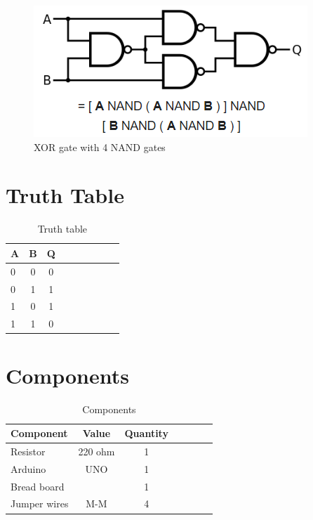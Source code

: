 \documentclass[10pt, a4paper]{article}
\begin{document}
\begin{figure}[H]
    \centering
    \includegraphics{XOR using NAND.png}
    \caption{XOR gate with 4 NAND gates}
    \label{fig XOR NAND}
\end{figure}


\section{Truth Table}

\begin{table}[H]
 \begin{center}
    \begin{tabular}{|l|c|c|c|c|c|c|c|c} \hline \textbf{A}
  & \textbf{B} & \textbf{Q} \\
 \hline
0&0&0 \\ \hline
0&1&1 \\ \hline
1&0&1\\ \hline
1&1&0  \\ \hline
\end{tabular}   
\end{center}
\caption{Truth table}
\label{table 1}
\end{table}


\section{Components}



\begin{table}[H]
 \begin{center}
    \begin{tabular}{|l|c|c|c|c|c|c} \hline \textbf{Component}
  & \textbf{Value} & \textbf{Quantity} \\
 \hline
Resistor & 220 ohm & 1 \\ \hline
Arduino & UNO & 1 \\ \hline
Bread board &  & 1 \\ \hline
Jumper wires & M-M & 4\\ \hline
\end{tabular}   
\end{center}
\caption{Components}
\label{table 2}
\end{table}
\end{document}
